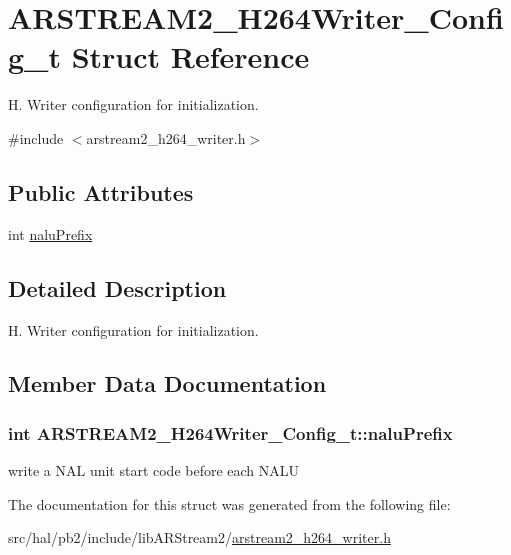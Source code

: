 \hypertarget{struct_a_r_s_t_r_e_a_m2___h264_writer___config__t}{}\section{A\+R\+S\+T\+R\+E\+A\+M2\+\_\+\+H264\+Writer\+\_\+\+Config\+\_\+t Struct Reference}
\label{struct_a_r_s_t_r_e_a_m2___h264_writer___config__t}


H. Writer configuration for initialization.  




{\ttfamily \#include $<$arstream2\+\_\+h264\+\_\+writer.\+h$>$}

\subsection*{Public Attributes}
\begin{DoxyCompactItemize}
\item 
int \hyperlink{struct_a_r_s_t_r_e_a_m2___h264_writer___config__t_af3066e18cce5842eefb2942aba4bfcfe}{nalu\+Prefix}
\end{DoxyCompactItemize}


\subsection{Detailed Description}
H. Writer configuration for initialization. 

\subsection{Member Data Documentation}
\subsubsection[{\texorpdfstring{nalu\+Prefix}{naluPrefix}}]{\setlength{\rightskip}{0pt plus 5cm}int A\+R\+S\+T\+R\+E\+A\+M2\+\_\+\+H264\+Writer\+\_\+\+Config\+\_\+t\+::nalu\+Prefix}\hypertarget{struct_a_r_s_t_r_e_a_m2___h264_writer___config__t_af3066e18cce5842eefb2942aba4bfcfe}{}\label{struct_a_r_s_t_r_e_a_m2___h264_writer___config__t_af3066e18cce5842eefb2942aba4bfcfe}
write a N\+AL unit start code before each N\+A\+LU 

The documentation for this struct was generated from the following file\+:\begin{DoxyCompactItemize}
\item 
src/hal/pb2/include/lib\+A\+R\+Stream2/\hyperlink{arstream2__h264__writer_8h}{arstream2\+\_\+h264\+\_\+writer.\+h}\end{DoxyCompactItemize}
